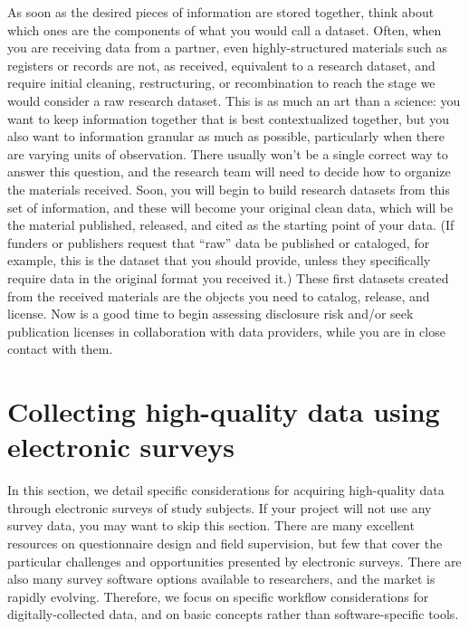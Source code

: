As soon as the desired pieces of information are stored together,
think about which ones are the components of what you would call a dataset.
Often, when you are receiving data from a partner,
even highly-structured materials such as registers or records
are not, as received, equivalent to a research dataset,
and require initial cleaning, restructuring, or recombination
to reach the stage we would consider a raw research dataset.
This is as much an art than a science:
you want to keep information together that is best contextualized together,
but you also want to information granular as much as possible,
particularly when there are varying units of observation.
There usually won't be a single correct way to answer this question,
and the research team will need to decide how to organize the materials received.
Soon, you will begin to build research datasets from this set of information,
and these will become your original clean data,
which will be the material published, released, and cited
as the starting point of your data.
(If funders or publishers request that ``raw'' data be published or cataloged,
for example, this is the dataset that you should provide,
unless they specifically require data in the original format you received it.)
These first datasets created from the received materials
are the objects you need to catalog, release, and license.
Now is a good time to begin assessing disclosure risk
and/or seek publication licenses in collaboration with data providers,
while you are in close contact with them.





\section{Collecting high-quality data using electronic surveys}
In this section, we detail specific considerations
for acquiring high-quality data through electronic surveys of study subjects.
If your project will not use any survey data, you may want to skip this section.
There are many excellent resources on questionnaire design and field supervision,
but few that cover the particular challenges and opportunities presented by electronic surveys.
There are also many survey software options available to researchers,
and the market is rapidly evolving.
Therefore, we focus on specific workflow considerations for digitally-collected data,
and on basic concepts rather than software-specific tools.

